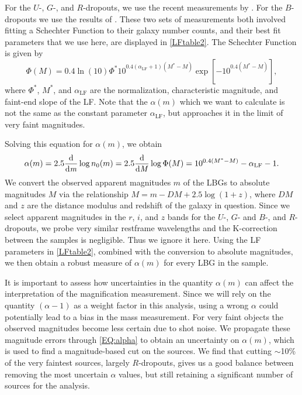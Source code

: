 For the $U$-, $G$-, and $R$-dropouts, we use the recent measurements by \citet{vanderBurg10}. For the $B$-dropouts we use the results of \citet{Sawicki06}. These two sets of measurements both involved fitting a Schechter Function \citep{Schechter76} to their galaxy number counts, and their best fit parameters that we use here, are displayed in \autoref{LFtable2}.  The Schechter Function is given by
\begin{equation}
\Phi(M)=0.4\ln(10)\Phi^\ast10^{0.4(\alpha_{\text{LF}}+1)(M^\ast-M)} \exp [-10^{0.4(M^\ast-M)}],
\end{equation}
where $\Phi^\ast$, $M^\ast$, and $\alpha_{\text{LF}}$ are the normalization, characteristic magnitude, and faint-end slope of the \ac{LF}.  Note that the $\alpha(m)$ which we want to calculate is not the same as the constant parameter $\alpha_{\text{LF}}$, but approaches it in the limit of very faint magnitudes.

Solving this equation for $\alpha(m)$, we obtain
\begin{equation}
\label{EQ:alpha}
\alpha(m) = 2.5 \frac{\mathrm d}{\mathrm d \it m} \log n_0(m)= 2.5 \frac{\mathrm d}{\mathrm d \it M} \log \Phi(M) = 10^{0.4(M^\ast-M)}-\alpha_{\text{LF}}-1.
\end{equation}
We convert the observed apparent magnitudes $m$ of the \ac{LBG}s to absolute magnitudes $M$ via the relationship $M = m - DM + 2.5 \log (1+z)$, where $DM$ and $z$ are the distance modulus and redshift of the galaxy in question. Since we select apparent magnitudes in the $r$, $i$, and $z$ bands for the $U$-, $G$- and $B$-, and $R$-dropouts, we probe very similar restframe wavelengths and the K-correction between the samples is negligible.  Thus we ignore it here. Using the \ac{LF} parameters in \autoref{LFtable2}, combined with the conversion to absolute magnitudes, we then obtain a robust measure of $\alpha(m)$ for every \ac{LBG} in the sample. 

It is important to assess how uncertainties in the quantity $\alpha(m)$ can affect the interpretation of the magnification measurement. Since we will rely on the quantity $(\alpha-1)$ as a weight factor in this analysis, using a wrong $\alpha$ could potentially lead to a bias in the mass measurement. For very faint objects the observed magnitudes become less certain due to shot noise. We propagate these magnitude errors through \autoref{EQ:alpha} to obtain an uncertainty on $\alpha(m)$, which is used to find a magnitude-based cut on the sources. We find that cutting $\sim$10\% of the very faintest sources, largely $R$-dropouts, gives us a good balance between removing the most uncertain $\alpha$ values, but still retaining a significant number of sources for the analysis.

